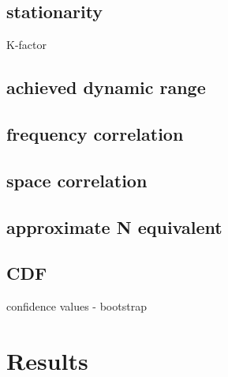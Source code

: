 \subsection{stationarity}
K-factor
\subsection{achieved dynamic range}
\subsection{frequency correlation}
\subsection{space correlation}
\subsection{approximate N equivalent}
\subsection{CDF}
confidence values - bootstrap

\section{Results}